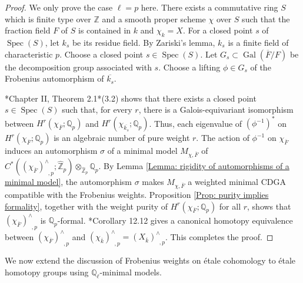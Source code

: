 \documentclass[11pt]{amsart}
\theoremstyle{definition}
\numberwithin{equation}{section}
\numberwithin{equation}{section}
\newcommand\QQ{\mathbb{Q}}
\newcommand\ZZ{\mathbb{Z}}
\DeclareMathOperator{\et}{\acute{e}t}
\DeclareMathOperator{\Gal}{Gal}
\DeclareMathOperator{\Spec}{Spec}
\begin{document}
\begin{proof}
We only prove the case $\ell=p$ here. There exists a commutative ring $S$ which is finite type over $\ZZ$ and a smooth proper scheme $\chi$ over $S$ such that the fraction field $F$ of $S$ is contained in $k$ and $\chi_{k}=X$. For a closed point $s$ of $\Spec(S)$, let $k_s$ be its residue field. By Zariski's lemma, $k_s$ is a finite field of characteristic $p$. Choose a closed point $s\in \Spec(S)$. Let $G_s\subset \Gal(\overline{F}/F)$ be the decomposition group associated with $s$. Choose a lifting $\phi\in G_s$ of the Frobenius automorphism of $\overline{k_s}$. 

\cite{Gros-Suwa}*{Chapter II, Theorem 2.1}\cite{Jannsen-weights}*{(3.2)} shows that there exists a closed point $s\in \Spec(S)$ such that, for every $r$, there is a Galois-equivariant isomorphism between $H^r_{\et}(\chi_{\overline{F}};\QQ_{p})$ and  $H^r_{\et}(\chi_{\overline{k_s}};\QQ_{p})$. Thus, each eigenvalue of $(\phi^{-1})^*$ on $H^r_{\et}(\chi_{\overline{F}};\QQ_{p})$ is an algebraic number of pure weight $r$. The action of $\phi^{-1}$ on $\chi_{\overline{F}}$ induces an automorphism $\sigma$ of a minimal model $M_{\chi,\overline{F}}$ of $C^*((\chi_{\overline{F}})^{\wedge}_{\et,p};\widehat{\ZZ}_p)\otimes_{\widehat{\ZZ}_p}\QQ_p$. By Lemma \ref{Lemma: rigidity of automorphisms of a minimal model}, the automorphism $\sigma$ makes $M_{\chi,\overline{F}}$ a weighted minimal CDGA compatible with the Frobenius weights. Proposition \ref{Prop: purity implies formality}, together with the weight purity of $H^r_{\et}(\chi_{\overline{F}};\QQ_{p})$ for all $r$, shows that $(\chi_{\overline{F}})^{\wedge}_{\et,p}$ is $\QQ_p$-formal. \cite{Artin-Mazur-etale-homotopy}*{Corollary 12.12} gives a canonical homotopy equivalence between  $(\chi_{\overline{F}})^{\wedge}_{\et,p}$ and $(\chi_{\overline{k}})^{\wedge}_{\et,p}=(X_{\overline{k}})^{\wedge}_{\et,p}$. This completes the proof.
\end{proof}

We now extend the discussion of Frobenius weights on \'etale cohomology to \'etale homotopy groups using $\QQ_{\ell}$-minimal models.
\end{document}
